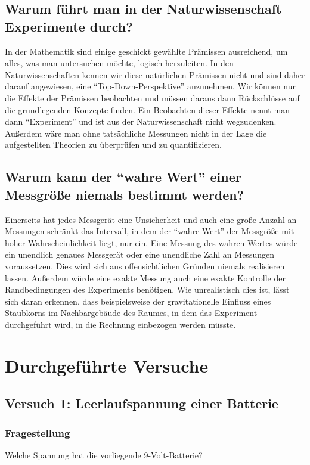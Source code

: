 \documentclass[
	a4paper,
	12pt,
	pagesize,
	ngerman
]{scrartcl}
\begin{document}
	\subsection{Warum führt man in der Naturwissenschaft Experimente durch?}
	In der Mathematik sind einige geschickt gewählte Prämissen ausreichend, um alles, was man untersuchen möchte, logisch herzuleiten. In den Naturwissenschaften kennen wir diese natürlichen Prämissen nicht und sind daher darauf angewiesen, eine \enquote{Top-Down-Perspektive} anzunehmen. Wir können nur die Effekte der Prämissen beobachten und müssen daraus dann Rückschlüsse auf die grundlegenden Konzepte finden. Ein Beobachten dieser Effekte nennt man dann \enquote{Experiment} und ist aus der Naturwissenschaft nicht wegzudenken. Außerdem wäre man ohne tatsächliche Messungen nicht in der Lage die aufgestellten Theorien zu überprüfen und zu quantifizieren.
	
	\subsection{Warum kann der “wahre Wert” einer Messgröße niemals bestimmt werden?}
	Einerseits hat jedes Messgerät eine Unsicherheit und auch eine große Anzahl an Messungen schränkt das Intervall, in dem der \enquote{wahre Wert} der Messgröße mit hoher Wahrscheinlichkeit liegt, nur ein. Eine Messung des wahren Wertes würde ein unendlich genaues Messgerät oder eine unendliche Zahl an Messungen voraussetzen. Dies wird sich aus offensichtlichen Gründen niemals realisieren lassen. Außerdem würde eine exakte Messung auch eine exakte Kontrolle der Randbedingungen des Experiments benötigen. Wie unrealistisch dies ist, lässt sich daran erkennen, dass beispielsweise der gravitationelle Einfluss eines Staubkorns im Nachbargebäude des Raumes, in dem das Experiment durchgeführt wird, in die Rechnung einbezogen werden müsste.
	
	\section{Durchgeführte Versuche}
	
	\subsection{Versuch 1: Leerlaufspannung einer Batterie}
	
	\subsubsection{Fragestellung}
	Welche Spannung hat die vorliegende 9-Volt-Batterie?
\end{document}

